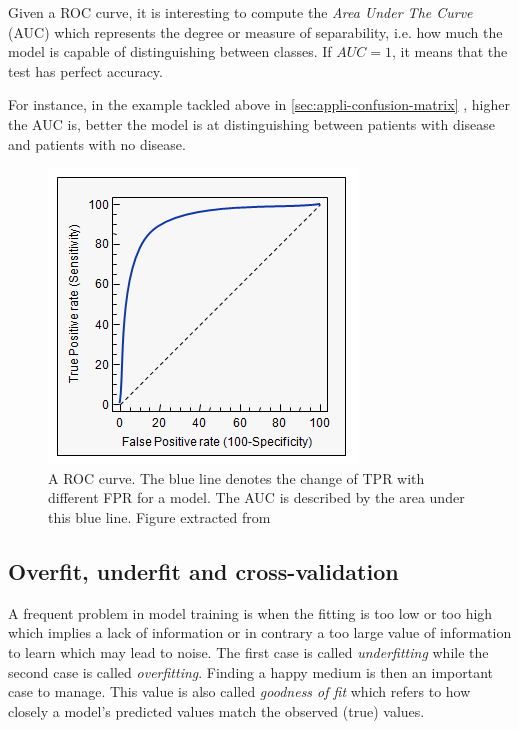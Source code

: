 \documentclass[11pt, openany]{report}
\theoremstyle{plain}
\theoremstyle{definition}
\theoremstyle{remark}
\begin{document}
Given a ROC curve, it is interesting to compute the \textit{Area Under The Curve} (AUC) which represents the degree or measure of separability, i.e. how much the model is capable of distinguishing between classes. If $AUC = 1$, it means that the test has perfect accuracy. 

For instance, in the example tackled above in \autoref{sec:appli-confusion-matrix} , higher the AUC is, better the model is at distinguishing between patients with disease and patients with no disease.

\begin{figure}[h]
  \centering
  \includegraphics[scale=0.8]{figures/roc-curve.png}
  \caption{A ROC curve. The blue line denotes the change of TPR with different FPR for a model. The AUC is described by the area under this blue line. Figure extracted from \cite{roc-schema} }
  \label{fig:roc-curve}
\end{figure}

\newpage
\subsection{Overfit, underfit and cross-validation}
A frequent problem in model training is when the fitting is too low or too high which implies a lack of information or in contrary a too large value of information to learn which may lead to noise. The first case is called \textit{underfitting} while the second case is called \textit{overfitting}. Finding a happy medium is then an important case to manage. This value is also called \textit{goodness of fit} which refers to how closely a model's predicted values match the observed (true) values.
\end{document}
